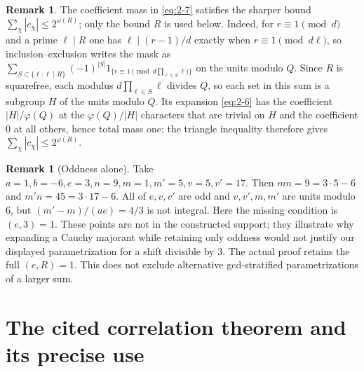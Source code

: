 \documentclass[11pt]{article}
\theoremstyle{definition}
\theoremstyle{definition}
\newtheorem{remark}[theorem]{Remark}
\begin{document}
\begin{remark}\label{rem:mask-mass}
The coefficient mass in \eqref{eq:2-7} satisfies the sharper bound \(\sum_\chi|c_\chi|\le2^{\omega(R)}\); only the bound \(R\) is used below.
Indeed, for \(r\equiv1\pmod d\) and a prime \(\ell\mid R\) one has \(\ell\mid(r-1)/d\) exactly when \(r\equiv1\pmod{d\ell}\), so inclusion--exclusion writes the mask as
\(\sum_{S\subset\{\ell:\ell\mid R\}}(-1)^{|S|}
1_{\{r\equiv1\pmod{d\prod_{\ell\in S}\ell}\}}\) on the units modulo \(Q\).
Since \(R\) is squarefree, each modulus \(d\prod_{\ell\in S}\ell\) divides \(Q\), so each set in this sum is a subgroup \(H\) of the units modulo \(Q\). Its expansion \eqref{eq:2-6} has the coefficient \(|H|/\varphi(Q)\) at the \(\varphi(Q)/|H|\) characters that are trivial on \(H\) and the coefficient \(0\) at all others, hence total mass one; the triangle inequality
therefore gives \(\sum_\chi|c_\chi|\le2^{\omega(R)}\).
\end{remark}
\begin{remark}[Oddness alone]\label{rem:oddness}
Take \(a=1,b=-6,e=3,n=9,m=1,m'=5,v=5,v'=17\). Then
\(mn=9=3\cdot5-6\) and \(m'n=45=3\cdot17-6\).
All of \(e,v,v'\) are odd and \(v,v',m,m'\) are units modulo \(6\), but
\((m'-m)/(ae)=4/3\) is not integral. Here the missing condition is \((e,3)=1\).
These points are not in the constructed support; they illustrate why expanding a Cauchy majorant while retaining only oddness would not justify our displayed parametrization for a shift divisible by 3. The actual proof retains the full \((e,R)=1\). This does not exclude alternative gcd-stratified parametrizations of a larger sum.



\end{remark}

\section{The cited correlation theorem and its precise use}\label{sec:s3}
\end{document}
